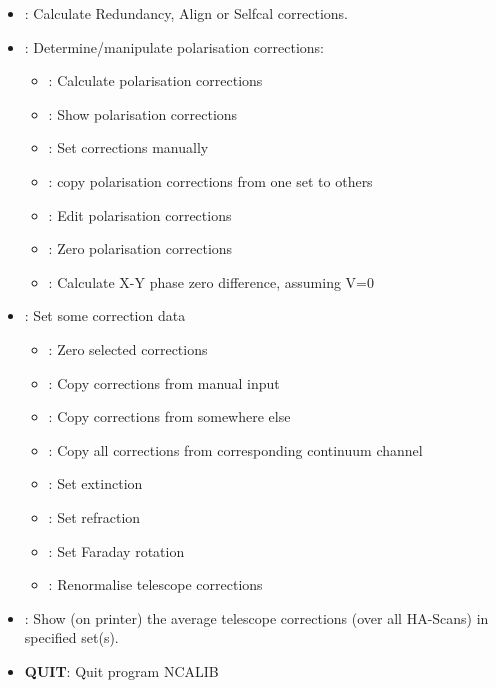 \begin{itemize}
\item {}: Calculate Redundancy, Align or
Selfcal corrections. %
\item
{}:
  Determine/manipulate polarisation corrections: %
  \begin{itemize}
  \item {}:  Calculate polarisation
corrections
  \item {}:  Show polarisation corrections
  \item {}:    Set corrections manually
  \item {}:  copy polarisation corrections
from one set to others
  \item {}: Edit polarisation corrections
  \item {}:  Zero polarisation corrections
  \item {}:        Calculate X-Y phase
zero difference, assuming V=0
  \end{itemize} %
\item   {}: Set some correction data %
  \begin{itemize}
  \item {}:          Zero selected corrections
  \item {}:      Copy corrections from manual
input
  \item {}:          Copy corrections from somewhere
else
  \item {}:          Copy all corrections from
corresponding continuum channel
  \item {}:    Set extinction
  \item {}:    Set refraction
  \item {}:    Set Faraday rotation
  \item {}:      Renormalise telescope
corrections
  \end{itemize} %
\item   {}:       Show (on printer) the average
telescope corrections (over all HA-Scans) in specified set(s). %
\item   {\bf QUIT}:     Quit program NCALIB
\end{itemize}



